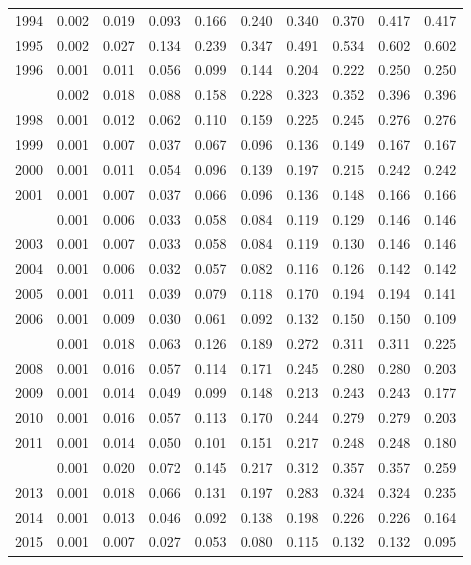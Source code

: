 \documentclass[
]{article}
\begin{document}
\begin{longtable}[t]{lrrrrrrrrr}
1994 & 0.002 & 0.019 & 0.093 & 0.166 & 0.240 & 0.340 & 0.370 & 0.417 & 0.417\\
1995 & 0.002 & 0.027 & 0.134 & 0.239 & 0.347 & 0.491 & 0.534 & 0.602 & 0.602\\
1996 & 0.001 & 0.011 & 0.056 & 0.099 & 0.144 & 0.204 & 0.222 & 0.250 & 0.250\\
\addlinespace
1997 & 0.002 & 0.018 & 0.088 & 0.158 & 0.228 & 0.323 & 0.352 & 0.396 & 0.396\\
1998 & 0.001 & 0.012 & 0.062 & 0.110 & 0.159 & 0.225 & 0.245 & 0.276 & 0.276\\
1999 & 0.001 & 0.007 & 0.037 & 0.067 & 0.096 & 0.136 & 0.149 & 0.167 & 0.167\\
2000 & 0.001 & 0.011 & 0.054 & 0.096 & 0.139 & 0.197 & 0.215 & 0.242 & 0.242\\
2001 & 0.001 & 0.007 & 0.037 & 0.066 & 0.096 & 0.136 & 0.148 & 0.166 & 0.166\\
\addlinespace
2002 & 0.001 & 0.006 & 0.033 & 0.058 & 0.084 & 0.119 & 0.129 & 0.146 & 0.146\\
2003 & 0.001 & 0.007 & 0.033 & 0.058 & 0.084 & 0.119 & 0.130 & 0.146 & 0.146\\
2004 & 0.001 & 0.006 & 0.032 & 0.057 & 0.082 & 0.116 & 0.126 & 0.142 & 0.142\\
2005 & 0.001 & 0.011 & 0.039 & 0.079 & 0.118 & 0.170 & 0.194 & 0.194 & 0.141\\
2006 & 0.001 & 0.009 & 0.030 & 0.061 & 0.092 & 0.132 & 0.150 & 0.150 & 0.109\\
\addlinespace
2007 & 0.001 & 0.018 & 0.063 & 0.126 & 0.189 & 0.272 & 0.311 & 0.311 & 0.225\\
2008 & 0.001 & 0.016 & 0.057 & 0.114 & 0.171 & 0.245 & 0.280 & 0.280 & 0.203\\
2009 & 0.001 & 0.014 & 0.049 & 0.099 & 0.148 & 0.213 & 0.243 & 0.243 & 0.177\\
2010 & 0.001 & 0.016 & 0.057 & 0.113 & 0.170 & 0.244 & 0.279 & 0.279 & 0.203\\
2011 & 0.001 & 0.014 & 0.050 & 0.101 & 0.151 & 0.217 & 0.248 & 0.248 & 0.180\\
\addlinespace
2012 & 0.001 & 0.020 & 0.072 & 0.145 & 0.217 & 0.312 & 0.357 & 0.357 & 0.259\\
2013 & 0.001 & 0.018 & 0.066 & 0.131 & 0.197 & 0.283 & 0.324 & 0.324 & 0.235\\
2014 & 0.001 & 0.013 & 0.046 & 0.092 & 0.138 & 0.198 & 0.226 & 0.226 & 0.164\\
2015 & 0.001 & 0.007 & 0.027 & 0.053 & 0.080 & 0.115 & 0.132 & 0.132 & 0.095\\

\end{longtable}
\end{document}
